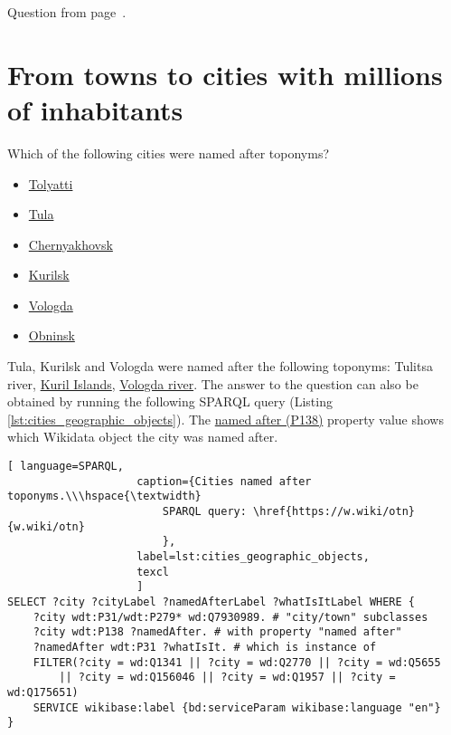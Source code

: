 Question from page~\pageref{question:aircraft_question_5}.



\section{From towns to cities with millions of inhabitants}

\begin{exercise}%
    \label{answer:cities_geographic_objects}
Which of the following cities were named after toponyms?
\begin{itemize}
\item \href{https://w.wiki/pzi}{Tolyatti}
\item \href{https://w.wiki/pzj}{Tula}
\item \href{https://w.wiki/pzk}{Chernyakhovsk}
\item \href{https://w.wiki/pzm}{Kurilsk}
\item \href{https://w.wiki/pzn}{Vologda}
\item \href{https://w.wiki/pzo}{Obninsk}
\end{itemize}
\end{exercise}

Tula, Kurilsk and Vologda were named after the following toponyms: Tulitsa river, \href{https://w.wiki/qqJ}{Kuril Islands}, \href{https://w.wiki/qqK}{Vologda river}. The answer to the question can also be obtained by running the following SPARQL query (Listing \ref{lst:cities_geographic_objects}). The \href{https://www.wikidata.org/wiki/Property:P138}{named after (P138)} property value shows which Wikidata object the city was named after.
    
\begin{lstlisting}[ language=SPARQL, 
                    caption={Cities named after toponyms.\\\hspace{\textwidth}
                        SPARQL query: \href{https://w.wiki/otn}{w.wiki/otn}
                        },
                    label=lst:cities_geographic_objects,
                    texcl 
                    ]
SELECT ?city ?cityLabel ?namedAfterLabel ?whatIsItLabel WHERE {
	?city wdt:P31/wdt:P279* wd:Q7930989. # "city/town" subclasses
	?city wdt:P138 ?namedAfter. # with property "named after"
	?namedAfter wdt:P31 ?whatIsIt. # which is instance of
	FILTER(?city = wd:Q1341 || ?city = wd:Q2770 || ?city = wd:Q5655 
		|| ?city = wd:Q156046 || ?city = wd:Q1957 || ?city = wd:Q175651)
	SERVICE wikibase:label {bd:serviceParam wikibase:language "en"}
}
\end{lstlisting}%

